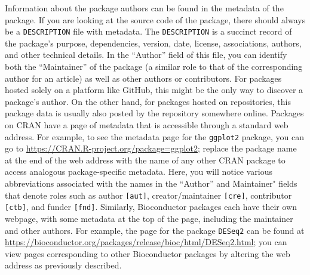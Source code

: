 \documentclass[10pt,letterpaper]{article}
\begin{document}
Information about the package authors can be found in the metadata of
the package. If you are looking at the source code of the package, there
should always be a \texttt{DESCRIPTION} file with metadata. The
\texttt{DESCRIPTION} is a succinct record of the package's purpose,
dependencies, version, date, license, associations, authors, and other
technical details. In the ``Author'' field of this file, you can
identify both the ``Maintainer'' of the package (a similar role to that
of the corresponding author for an article) as well as other authors or
contributors. For packages hosted solely on a platform like GitHub, this
might be the only way to discover a package's author. On the other hand,
for packages hosted on repositories, this package data is usually also
posted by the repository somewhere online. Packages on CRAN have a page
of metadata that is accessible through a standard web address. For
example, to see the metadata page for the \texttt{ggplot2} package, you
can go to \url{https://CRAN.R-project.org/package=ggplot2}; replace the
package name at the end of the web address with the name of any other
CRAN package to access analogous package-specific metadata. Here, you
will notice various abbreviations associated with the names in the
``Author'' and Maintainer" fields that denote roles such as author
\texttt{{[}aut{]}}, creator/maintainer \texttt{{[}cre{]}}, contributor
\texttt{{[}ctb{]}}, and funder \texttt{{[}fnd{]}}. Similarly,
Bioconductor packages each have their own webpage, with some metadata at
the top of the page, including the maintainer and other authors. For
example, the page for the package \texttt{DESeq2} can be found at
\url{https://bioconductor.org/packages/release/bioc/html/DESeq2.html};
you can view pages corresponding to other Bioconductor packages by
altering the web address as previously described.
\end{document}
